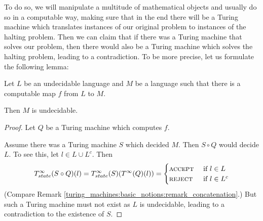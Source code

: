 To do so, we will manipulate a multitude of mathematical objects and usually do so in a computable way, making sure that in the end there will be a Turing machine which translates instances of our original problem to instances of the halting problem.
Then we can claim that if there was a Turing machine that solves our problem, then there would also be a Turing machine which solves the halting problem, leading to a contradiction.
To be more precise, let us formulate the following lemma:

\begin{Lemma}
	\label{halting_problem:computability:lemma_decidability}
	Let $L$ be an undecidable language
	and $M$ be a language such that there is a computable map $f$ from $L$ to $M$.

	Then $M$ is undecidable.
\end{Lemma}
\begin{proof}
	Let $Q$ be a Turing machine which computes $f$.

	Assume there was a Turing machine $S$ which decided $M$.
	Then $S \circ Q$ would decide $L$.
	To see this, let $l \in L \cup L^c$. Then 
	\begin{align*}
		T_{state}^\infty(S \circ Q)(l) = T_{state}^\infty(S) (T^\infty(Q)(l)) = \begin{cases} \text{\scshape{accept}} &~\text{if}~ l \in L \\ \text{\scshape{reject}} &~\text{if}~ l \in L^c\end{cases}
	\end{align*}
	(Compare Remark \ref{turing_machines:basic_notions:remark_concatenation}.)
	But such a Turing machine must not exist as $L$ is undecidable, leading to a contradiction to the existence of $S$.
\end{proof}

